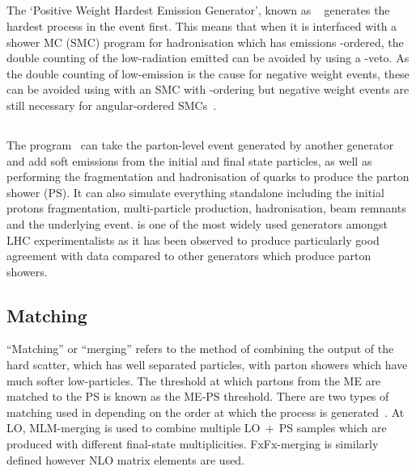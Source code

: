 \subsection{\POWHEG}
The `Positive Weight Hardest Emission Generator', known as \POWHEG~\cite{POWHEG} generates the hardest process in the event first. This means that when it is interfaced with a shower MC (SMC) program for hadronisation which has emissions \pt-ordered, the double counting of the low-\pt radiation emitted can be avoided by using a \pt-veto. As the double counting of low-\pt emission is the cause for negative weight events, these can be avoided using \POWHEG with an SMC with \pt-ordering but negative weight events are still necessary for angular-ordered SMCs~\cite{Oleari:2010nx}. 


\subsection{\PYTHIA}
The \PYTHIA program~\cite{pythia} can take the parton-level event generated by another generator and add soft emissions from the initial and final state particles, as well as performing the fragmentation and hadronisation of quarks to produce the parton shower (PS). It can also simulate everything standalone including the initial protons fragmentation, multi-particle production, hadronisation, beam remnants and the underlying event. \PYTHIA is one of the most widely used generators amongst LHC experimentalists as it has been observed to produce particularly good agreement with data compared to other generators which produce parton showers.\\



\subsection{Matching}
``Matching'' or ``merging'' refers to the method of combining the output of the hard scatter, which has well separated particles, with parton showers which have much softer low-\pt particles. The \pt threshold at which partons from the ME are matched to the PS is known as the ME-PS threshold.
There are two types of matching used in \MADGRAPH depending on the order at which the process is generated~\cite{Degrande:2014sta}. At LO, MLM-merging is used to combine multiple LO$~+~$PS samples which are produced with different final-state multiplicities. FxFx-merging is similarly defined however NLO matrix elements are used.
